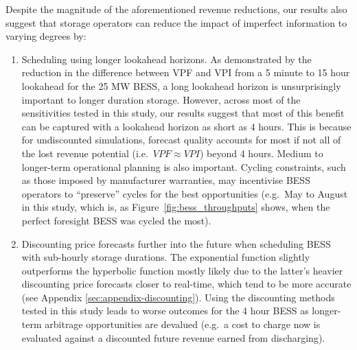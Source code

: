 \documentclass[12pt,a4paper,]{report}
\begin{document}
Despite the magnitude of the aforementioned revenue reductions, our
results also suggest that storage operators can reduce the impact of
imperfect information to varying degrees by:

\begin{enumerate}
\def\labelenumi{\arabic{enumi}.}
\item
  Scheduling using longer lookahead horizons. As demonstrated by the
  reduction in the difference between VPF and VPI from a 5 minute to 15
  hour lookahead for the 25 MW BESS, a long lookahead horizon is
  unsurprisingly important to longer duration storage. However, across
  most of the sensitivities tested in this study, our results suggest
  that most of this benefit can be captured with a lookahead horizon as
  short as 4 hours. This is because for undiscounted simulations,
  forecast quality accounts for most if not all of the lost revenue
  potential (i.e.~\(VPF \approx VPI\)) beyond 4 hours. Medium to
  longer-term operational planning is also important. Cycling
  constraints, such as those imposed by manufacturer warranties, may
  incentivise BESS operators to ``preserve'' cycles for the best
  opportunities (e.g.~May to August in this study, which is, as
  Figure~\ref{fig:bess_throughputs} shows, when the perfect foresight
  BESS was cycled the most).
\item
  Discounting price forecasts further into the future when scheduling
  BESS with sub-hourly storage durations. The exponential function
  slightly outperforms the hyperbolic function mostly likely due to the
  latter's heavier discounting price forecasts closer to real-time,
  which tend to be more accurate (see Appendix
  \ref{sec:appendix-discounting}). Using the discounting methods tested
  in this study leads to worse outcomes for the 4 hour BESS as
  longer-term arbitrage opportunities are devalued (e.g.~a cost to
  charge now is evaluated against a discounted future revenue earned
  from discharging).
\end{enumerate}
\end{document}
